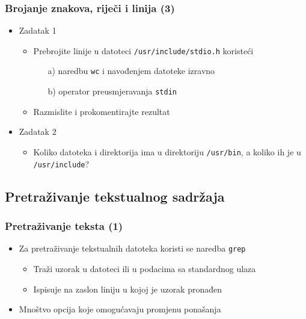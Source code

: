 \documentclass{beamer}
\newcommand{\shell}[1]{\texttt{#1}}
\begin{document}
\begin{frame}[t]
\frametitle{Brojanje znakova, riječi i linija (3)}
\begin{itemize}
  \item Zadatak 1
  \begin{itemize}
	\item Prebrojite linije u datoteci \shell{/usr/include/stdio.h} koristeći
	\begin{itemize}
		\item[a)] naredbu \shell{wc} i navođenjem datoteke izravno
		\item[b)] operator preusmjeravanja \shell{stdin}
	\end{itemize}
	\item Razmislite i prokomentirajte rezultat
  \end{itemize}
  \item[]
  \item Zadatak 2
  \begin{itemize}
    \item Koliko datoteka i direktorija ima u direktoriju \shell{/usr/bin},
          a koliko ih je u \shell{/usr/include}?
  \end{itemize}
\end{itemize}
\end{frame}

\subsection{Pretraživanje tekstualnog sadržaja}
\begin{frame}[t]
\frametitle{Pretraživanje teksta (1)}
\begin{itemize}
  \item Za pretraživanje tekstualnih datoteka koristi se naredba 
        \shell{grep}
  \begin{itemize}
    \item Traži uzorak u datoteci ili u podacima sa standardnog ulaza
    \item Ispisuje na zaslon liniju u kojoj je uzorak pronađen
  \end{itemize}
  \item Mnoštvo opcija koje omogućavaju promjenu ponašanja
\end{itemize}
\end{frame}
\end{document}
